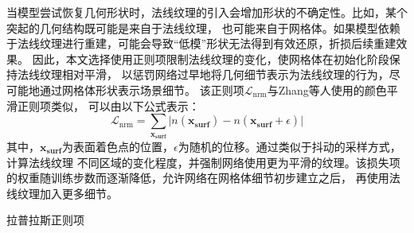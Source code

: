 当模型尝试恢复几何形状时，法线纹理的引入会增加形状的不确定性。比如，某个突起的几何结构既可能是来自于法线纹理，
也可能来自于网格体。如果模型依赖于法线纹理进行重建，可能会导致“低模”形状无法得到有效还原，折损后续重建效果。
因此，本文选择使用正则项限制法线纹理的变化，使网格体在初始化阶段保持法线纹理相对平滑，
以惩罚网络过早地将几何细节表示为法线纹理的行为，尽可能地通过网格体形状表示场景细节。
该正则项$\mathcal{L}_{\text{nrm}}$与Zhang等人\cite{zhang2021nerfactor}使用的颜色平滑正则项类似，
可以由以下公式表示：
\begin{equation}
  \label{eq:nrm_smooth}
  \mathcal{L}_{\text{nrm}} = \sum_{\mathbf{x_\text{surf}}} {\lvert {n({\mathbf{x_\text{surf}}})} - {n({\mathbf{x_\text{surf}}}+\epsilon)}\rvert}
\end{equation}
其中，$\mathbf{x_\text{surf}}$为表面着色点的位置，$\epsilon$为随机的位移。通过类似于抖动的采样方式，计算法线纹理
不同区域的变化程度，并强制网络使用更为平滑的纹理。该损失项的权重随训练步数而逐渐降低，允许网络在网格体细节初步建立之后，
再使用法线纹理加入更多细节。

拉普拉斯正则项

